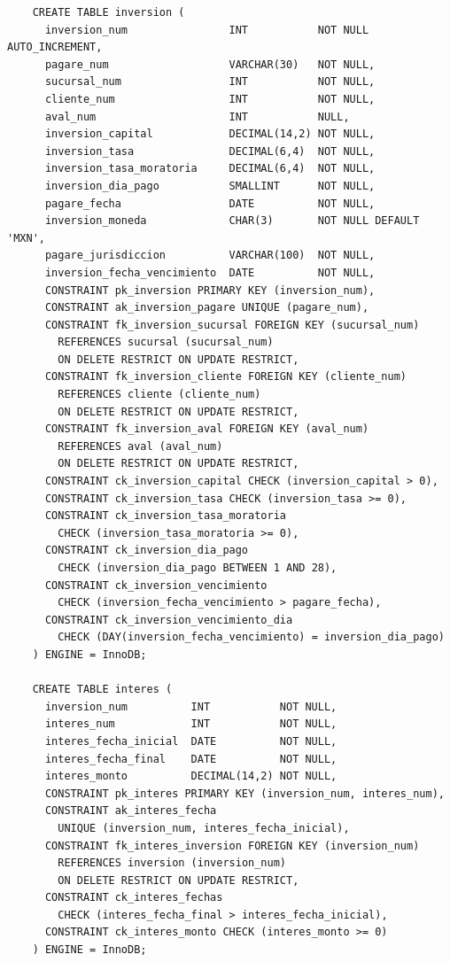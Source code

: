 \begin{verbatim}
	CREATE TABLE inversion (
	  inversion_num                INT           NOT NULL AUTO_INCREMENT,
	  pagare_num                   VARCHAR(30)   NOT NULL,
	  sucursal_num                 INT           NOT NULL,
	  cliente_num                  INT           NOT NULL,
	  aval_num                     INT           NULL,
	  inversion_capital            DECIMAL(14,2) NOT NULL,
	  inversion_tasa               DECIMAL(6,4)  NOT NULL,
	  inversion_tasa_moratoria     DECIMAL(6,4)  NOT NULL,
	  inversion_dia_pago           SMALLINT      NOT NULL,
	  pagare_fecha                 DATE          NOT NULL,
	  inversion_moneda             CHAR(3)       NOT NULL DEFAULT 'MXN',
	  pagare_jurisdiccion          VARCHAR(100)  NOT NULL,
	  inversion_fecha_vencimiento  DATE          NOT NULL,
	  CONSTRAINT pk_inversion PRIMARY KEY (inversion_num),
	  CONSTRAINT ak_inversion_pagare UNIQUE (pagare_num),
	  CONSTRAINT fk_inversion_sucursal FOREIGN KEY (sucursal_num)
	    REFERENCES sucursal (sucursal_num)
	    ON DELETE RESTRICT ON UPDATE RESTRICT,
	  CONSTRAINT fk_inversion_cliente FOREIGN KEY (cliente_num)
	    REFERENCES cliente (cliente_num)
	    ON DELETE RESTRICT ON UPDATE RESTRICT,
	  CONSTRAINT fk_inversion_aval FOREIGN KEY (aval_num)
	    REFERENCES aval (aval_num)
	    ON DELETE RESTRICT ON UPDATE RESTRICT,
	  CONSTRAINT ck_inversion_capital CHECK (inversion_capital > 0),
	  CONSTRAINT ck_inversion_tasa CHECK (inversion_tasa >= 0),
	  CONSTRAINT ck_inversion_tasa_moratoria
	    CHECK (inversion_tasa_moratoria >= 0),
	  CONSTRAINT ck_inversion_dia_pago
	    CHECK (inversion_dia_pago BETWEEN 1 AND 28),
	  CONSTRAINT ck_inversion_vencimiento
	    CHECK (inversion_fecha_vencimiento > pagare_fecha),
	  CONSTRAINT ck_inversion_vencimiento_dia
	    CHECK (DAY(inversion_fecha_vencimiento) = inversion_dia_pago)
	) ENGINE = InnoDB;

	CREATE TABLE interes (
	  inversion_num          INT           NOT NULL,
	  interes_num            INT           NOT NULL,
	  interes_fecha_inicial  DATE          NOT NULL,
	  interes_fecha_final    DATE          NOT NULL,
	  interes_monto          DECIMAL(14,2) NOT NULL,
	  CONSTRAINT pk_interes PRIMARY KEY (inversion_num, interes_num),
	  CONSTRAINT ak_interes_fecha
	    UNIQUE (inversion_num, interes_fecha_inicial),
	  CONSTRAINT fk_interes_inversion FOREIGN KEY (inversion_num)
	    REFERENCES inversion (inversion_num)
	    ON DELETE RESTRICT ON UPDATE RESTRICT,
	  CONSTRAINT ck_interes_fechas
	    CHECK (interes_fecha_final > interes_fecha_inicial),
	  CONSTRAINT ck_interes_monto CHECK (interes_monto >= 0)
	) ENGINE = InnoDB;


\end{verbatim}
